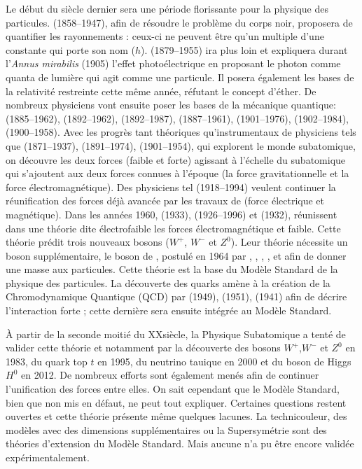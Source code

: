 Le début du siècle dernier sera une période florissante pour la physique des particules.  (\num{1858}--\num{1947}), afin de résoudre le problème du corps noir, proposera de quantifier les rayonnements : ceux-ci ne peuvent être qu'un multiple d'une constante qui porte son nom ($h$).  (\num{1879}--\num{1955}) ira plus loin et expliquera durant l'\textit{Annus mirabilis} (\num{1905}) l'effet photoélectrique en proposant le photon comme quanta de lumière qui agit comme une particule. Il posera également les bases de la relativité restreinte cette même année, réfutant le concept d'éther. De nombreux physiciens vont ensuite poser les bases de la mécanique quantique:  (\num{1885}--\num{1962}),  (\num{1892}--\num{1962}),  (\num{1892}--\num{1987}),  (\num{1887}--\num{1961}),  (\num{1901}--\num{1976}),  (\num{1902}--\num{1984}),  (\num{1900}--\num{1958}). Avec les progrès tant théoriques qu'instrumentaux de physiciens tels que  (\num{1871}--\num{1937}),  (\num{1891}--\num{1974}),  (\num{1901}--\num{1954}), qui explorent le monde subatomique, on découvre les deux forces (faible et forte) agissant à l'échelle du subatomique qui s'ajoutent aux deux forces connues à l'époque (la force gravitationnelle et la force électromagnétique). Des physiciens tel  (\num{1918}--\num{1994}) veulent continuer la réunification des forces déjà avancée par les travaux de  (force électrique et magnétique). Dans les années \num{1960},  (\num{1933}),  (\num{1926}--\num{1996}) et  (\num{1932}), réunissent dans une théorie dite électrofaible les forces électromagnétique et faible. Cette théorie prédit trois nouveaux bosons ($W^{+}$, $W^{-}$ et $Z^{0}$). Leur théorie nécessite un boson supplémentaire, le boson de , postulé en \num{1964} par , , , ,  et  afin de donner une masse aux particules. Cette théorie est la base du Modèle Standard de la physique des particules. La découverte des quarks amène à la création de la Chromodynamique Quantique (QCD) par  (\num{1949}),  (\num{1951}),  (\num{1941}) afin de décrire l'interaction forte ; cette dernière sera ensuite intégrée au Modèle Standard.

À partir de la seconde moitié du XX\ieme siècle, la Physique Subatomique a tenté de valider cette théorie et notamment par la découverte des bosons  $W^{+}$,$W^{-}$ et $Z^{0}$ en \num{1983}, du quark top $t$ en \num{1995}, du neutrino tauique en \num{2000} et du boson de Higgs $H^{0}$ en \num{2012}. De nombreux efforts sont également menés afin de continuer l'unification des forces entre elles. On sait cependant que le Modèle Standard, bien que non mis en défaut, ne peut tout expliquer. Certaines questions restent ouvertes et cette théorie présente même quelques lacunes. La technicouleur, des modèles avec des dimensions supplémentaires ou la Supersymétrie sont des théories d'extension du Modèle Standard. Mais aucune n'a pu être encore validée expérimentalement.


